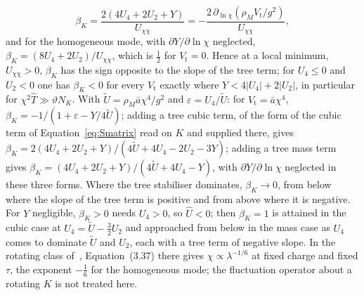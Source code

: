 \[
\beta_K=\frac{2(4U_4+2U_2+Y)}{U_{\chi\chi}}=-\frac{2\,\partial_{\ln\chi}(\rho_MV_{\mathrm t}/g^2)}{U_{\chi\chi}},
\]
and for the homogeneous mode, with \(\partial Y/\partial\ln\chi\) neglected, \(\beta_K=(8U_4+2U_2)/U_{\chi\chi}\), which is \(\tfrac12\) for \(V_{\mathrm t}=0\). Hence at a local minimum, \(U_{\chi\chi}>0\), \(\beta_K\) has the sign opposite to the slope of the tree term; for \(U_4\le0\) and \(U_2<0\) one has \(\beta_K<0\) for every \(V_{\mathrm t}\) exactly where \(Y<4|U_4|+2|U_2|\), in particular for \(\chi^2\hat T\gg\vartheta N_K\). With \(\tilde U=\rho_M\bar a\chi^4/g^2\) and \(\varepsilon=U_4/\tilde U\): for \(V_{\mathrm t}=\bar a\chi^4\), \(\beta_K=-1/(1+\varepsilon-Y/4\tilde U)\); adding a tree cubic term, of the form of the cubic term of Equation~\eqref{eq:Smatrix} read on \(K\) and supplied there, gives \(\beta_K=2(4U_4+2U_2+Y)/(4\tilde U+4U_4-2U_2-3Y)\); adding a tree mass term gives \(\beta_K=(4U_4+2U_2+Y)/(4\tilde U+4U_4-Y)\), with \(\partial Y/\partial\ln\chi\) neglected in these three forms. Where the tree stabiliser dominates, \(\beta_K\to0\), from below where the slope of the tree term is positive and from above where it is negative. For \(Y\) negligible, \(\beta_K>0\) needs \(U_4>0\), so \(\hat U<0\); then \(\beta_K=1\) is attained in the cubic case at \(U_4=\tilde U-\tfrac32U_2\) and approached from below in the mass case as \(U_4\) comes to dominate \(\tilde U\) and \(U_2\), each with a tree term of negative slope. In the rotating class of~\cite{MantaSteinacker2025b}, Equation~(3.37) there gives \(\chi\propto\lambda^{-1/6}\) at fixed charge and fixed \(\tau\), the exponent \(-\tfrac16\) for the homogeneous mode; the fluctuation operator about a rotating \(K\) is not treated here.

